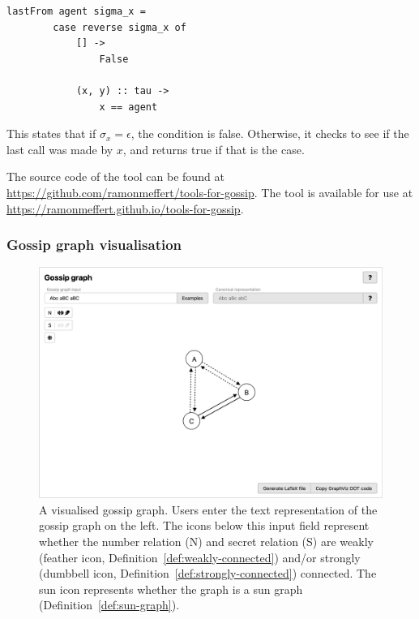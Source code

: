 \begin{lstlisting}[caption={\(\sigma_x = \tau \conc xy\) in Elm.}, label=lst:elm-ex-1]
    lastFrom agent sigma_x = 
        case reverse sigma_x of
            [] ->
                False

            (x, y) :: tau ->
                x == agent
\end{lstlisting}

This states that if \(\sigma_x = \epsilon\), the condition is false. 
Otherwise, it checks to see if the last call was made by \(x\), and returns true if that is the case.

The source code of the tool can be found at \url{https://github.com/ramonmeffert/tools-for-gossip}.
The tool is available for use at \url{https://ramonmeffert.github.io/tools-for-gossip}.

\subsubsection{Gossip graph visualisation}\label{sec:gossip-graph-visualisation}

\begin{figure}[btp]
    \includegraphics[width=\linewidth]{img/gossip-graph.png}
    \caption{A visualised gossip graph. Users enter the text representation of the gossip graph on the left. The icons below this input field represent whether the number relation (N) and secret relation (S) are weakly (feather icon, Definition~\ref{def:weakly-connected}) and/or  strongly (dumbbell icon, Definition~\ref{def:strongly-connected}) connected. The sun icon represents whether the graph is a sun graph (Definition~\ref{def:sun-graph}).}
    \label{fig:gossip-graph}
\end{figure}

